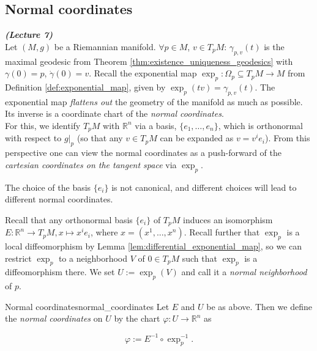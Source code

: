 




\subsection{Normal coordinates}
\vspace{0.4cm}\emph{\textbf{(Lecture 7)}}\\



Let $(M, g)$ be a Riemannian manifold.
$\forall p \in M$, $v \in T_p M$: $\gamma_{p,v}(t)$ is the maximal geodesic from Theorem \ref{thm:existence_uniqueness_geodesics} with $\gamma(0) = p$, $\dot{\gamma}(0) = v$. Recall the exponential map $\exp_p : \Omega_p \subseteq T_p M \to M$ from Definition \ref{def:exponential_map}, given by $\exp_p(tv) = \gamma_{p,v}(t)$. The exponential map \emph{flattens out} the geometry of the manifold as much as possible. Its inverse is a coordinate chart of the \emph{normal coordinates}.\\

For this, we identify $T_p M$ with $\mathbb{R}^n$ via a basis, $\{e_1, \ldots, e_n\}$, which is orthonormal with respect to $g|_p$ (so that any $v\in T_pM$ can be expanded as $v=v^i e_i$). From this perspective one can view the normal coordinates as a push-forward of the \emph{cartesian coordinates on the tangent space} via $\exp_p$.

\begin{colremark}
\label{rem:nonuniqueness_normal_coordinates}
The choice of the basis $\{e_i\}$ is not canonical, and different choices will lead to different normal coordinates.
\end{colremark}


Recall that any orthonormal basis $\{e_i\}$ of $T_pM$ induces an isomorphism $E: \mathbb{R}^n \to T_p M, x \mapsto x^i e_i$, where $x=(x^1,...,x^n)$. Recall further that $\exp_p$ is a local diffeomorphism by Lemma \ref{lem:differential_exponential_map}, so we can restrict $\exp_p$ to a neighborhood $V$ of $0 \in T_p M$ such that $\exp_p$ is a diffeomorphism there. We set $U:=\exp_p(V)$ and call it a \emph{normal neighborhood} of $p$.

\begin{colordef}{Normal coordinates}{normal_coordinates}
Let $E$ and $U$ be as above. Then we define the \emph{normal coordinates} on $U$ by the chart $\varphi: U \to \mathbb{R}^n$ as

$$\varphi :=E^{-1}\circ \exp_p^{-1}.$$


\end{colordef}



